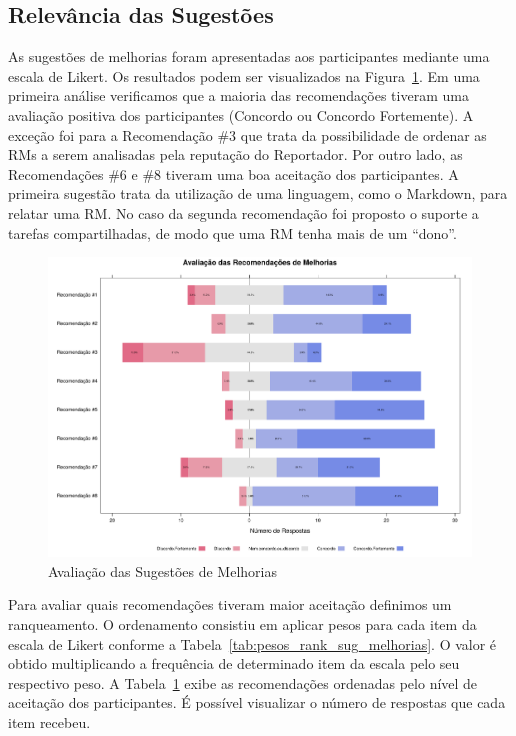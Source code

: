 \subsection{Relevância das Sugestões}
\label{sub:sug_melhorias_resultados_relevancia}

As sugestões de melhorias foram apresentadas aos participantes mediante uma
escala de Likert. Os resultados podem ser visualizados na
Figura~\ref{fig:plot_likert_avaliacao_sug_melhorias}. Em uma primeira análise
verificamos que a maioria das recomendações tiveram uma avaliação positiva dos
participantes (Concordo ou Concordo Fortemente). A exceção foi para a
Recomendação \#3 que trata da possibilidade de ordenar as RMs a serem
analisadas pela reputação do Reportador. Por outro lado, as Recomendações \#6 e
\#8 tiveram uma boa aceitação dos participantes. A primeira sugestão trata da
utilização de uma linguagem, como o Markdown, para relatar uma RM\@. No caso da
segunda recomendação foi proposto o suporte a tarefas compartilhadas, de modo
que uma RM tenha mais de um ``dono''.

\begin{figure}[htpb]
    \centering
    \includegraphics[width=1.1\linewidth]{chapter-sugestoes-melhorias-fgrm/img/plot_likert_avaliacao_sug_melhorias.pdf}
    \caption{Avaliação das Sugestões de Melhorias}
\label{fig:plot_likert_avaliacao_sug_melhorias}
\end{figure}

Para avaliar quais recomendações tiveram maior aceitação definimos um
ranqueamento. O ordenamento consistiu em aplicar pesos para cada item da escala
de Likert conforme a Tabela~\ref{tab:pesos_rank_sug_melhorias}. O valor é
obtido multiplicando a frequência de determinado item da escala pelo seu
respectivo peso. A Tabela~\ref{fig:plot_likert_avaliacao_sug_melhorias} exibe
as recomendações ordenadas pelo nível de aceitação dos participantes. É
possível visualizar o número de respostas que cada item recebeu.

